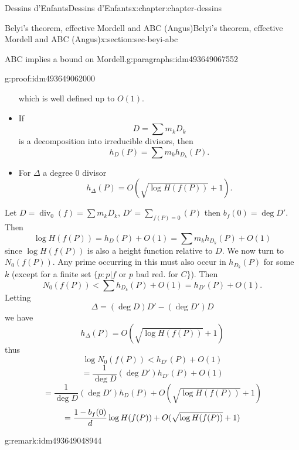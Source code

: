 \documentclass[oneside,10pt,]{book}
\newcommand{\qedhere}{\relax}
\numberwithin{equation}{section}
\DeclareMathOperator{\divisor}{div}
\newcommand{\lt}{<}
\begin{document}
\begin{chapterptx}{Dessins d'Enfants}{}{Dessins d'Enfants}{}{}{x:chapter:chapter-dessins}
\begin{sectionptx}{Belyi's theorem, effective Mordell and ABC (Angus)}{}{Belyi's theorem, effective Mordell and ABC (Angus)}{}{}{x:section:sec-beyi-abc}
\begin{paragraphs}{ABC implies a bound on Mordell.}{g:paragraphs:idm493649067552}
\begin{proofptx}{}{g:proof:idm493649062000}
\begin{itemize}[label=\textbullet]
which is well defined up to  \(O(1)\).%
\item{}If%
\begin{equation*}
D=  \sum m_k D_k
\end{equation*}
is a decomposition into irreducible divisors, then%
\begin{equation*}
h_D(P) = \sum m_k h_{D_k}(P)\text{.}
\end{equation*}
%
\item{}For \(\Delta\) a degree 0 divisor%
\begin{equation*}
h_{\Delta} (P) = O(\sqrt{\log H(f(P))} + 1)\text{.}
\end{equation*}
%
\end{itemize}
%
\par
Let \(D = \divisor_0(f) = \sum m_k D_k\), \(D' = \sum_{f(P) = 0} (P)\) then \(b_f(0) = \deg D'\). Then%
\begin{equation*}
\log H(f(P)) = h_D(P) + O(1) = \sum m_k h_{D_k}(P) + O(1)
\end{equation*}
since \(\log H(f(P))\) is also a height function relative to \(D\). We now turn to \(N_0(f(P))\). Any prime occurring in this must also occur in \(h_{D_k}(P)\) for some \(k\) (except for a finite set \(\{p : p|f \text{ or } p \text{ bad red. for } C\}\)). Then%
\begin{equation*}
N_0(f(P))  \lt \sum h_{D_k}(P) + O(1) = h_{D'}(P) + O(1)\text{.}
\end{equation*}
Letting%
\begin{equation*}
\Delta = (\deg D) D' - (\deg D') D
\end{equation*}
we have%
\begin{equation*}
h_{\Delta} (P) = O(\sqrt{\log H(f(P))} + 1)
\end{equation*}
thus%
\begin{equation*}
\log N_0(f(P)) \lt h_{D'} (P) + O(1)
\end{equation*}
%
\begin{equation*}
= \frac{1}{\deg D} (\deg D') h_{D'} (P) + O(1)
\end{equation*}
%
\begin{equation*}
= \frac{1}{\deg D} (\deg D') h_{D} (P) + O(\sqrt{\log H(f(P))} + 1)
\end{equation*}
%
\begin{equation*}
= \frac{1- b_f(0)}{d} \log  H(f(P)) + O(\sqrt{\log H(f(P))} + 1)\qedhere
\end{equation*}
%
\end{proofptx}
\begin{remark}{}{g:remark:idm493649048944}%

\end{remark}
\end{paragraphs}
\end{sectionptx}
\end{chapterptx}
\end{document}
